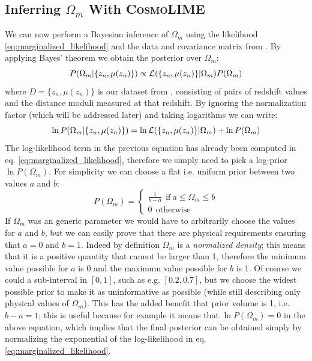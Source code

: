\subsection{Inferring $\Omega_m$ With \textsc{CosmoLIME}}
We can now perform a Bayesian inference of $\Omega_m$ using the likelihood \eqref{eq:marginalized_likelihood} and the data and covariance matrix from \cite{dark_energy_data}.
By applying Bayes' theorem we obtain the posterior over $\Omega_m$:
\begin{equation*}
    P(\Omega_m|\{z_n, \mu(z_n)\}) \propto \mathcal{L}(\{z_n, \mu(z_n)\}|\Omega_m) P(\Omega_m)
\end{equation*}
where $D = \{z_n, \mu(z_n)\}$ is our dataset from \cite{dark_energy_data}, consisting of pairs of redshift values and the distance moduli measured at that redshift.
By ignoring the normalization factor (which will be addressed later) and taking logarithms we can write:
\begin{equation*}
    \ln P(\Omega_m|\{z_n, \mu(z_n)\}) = \ln\mathcal{L}(\{z_n, \mu(z_n)\}|\Omega_m) + \ln P(\Omega_m)
\end{equation*}
The log-likelihood term in the previous equation has already been computed in eq. \eqref{eq:marginalized_likelihood}, therefore we simply need to pick a log-prior  $\ln P(\Omega_m)$. For simplicity we can choose a flat i.e. uniform prior between two values $a$ and $b$:
\begin{equation*}
    P(\Omega_m) = 
    \begin{cases}
        \frac{1}{b-a} \ \ \text{if} \ a\leq \Omega_m\leq b\\
        0 \ \ \text{otherwise}
    \end{cases}
\end{equation*}
If $\Omega_m$  was an generic parameter we would have to arbitrarily choose the values for $a$ and $b$, but we can easily prove that there are physical requirements ensuring that $a=0$ and $b=1$. Indeed by definition $\Omega_m$ is a \emph{normalized density}; this means that it is a positive quantity that cannot be larger than 1, therefore the minimum value possible for $a$ is 0 and the maximum value possible for $b$ is 1. Of course we could a sub-interval in $[0, 1]$, such as e.g. $[0.2, 0.7]$, but we choose the widest possible prior to make it as uninformative as possible (while still describing only physical values of $\Omega_m$). This has the added benefit that prior volume is 1, i.e. $b-a=1$; this is useful because for example it means that $\ln P(\Omega_m) = 0$ in the above equation, which implies that the final posterior can be obtained simply by normalizing the exponential of the log-likelihood in eq. \eqref{eq:marginalized_likelihood}.

